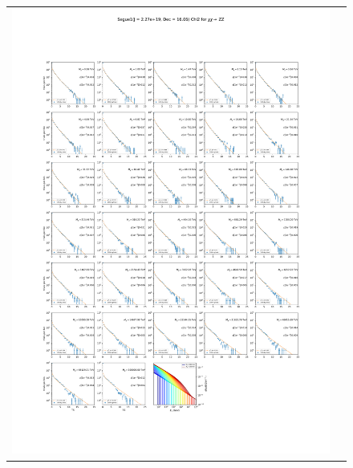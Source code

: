 \begin{figure}[ht]
{\begin{tabular}{cc}
            \includegraphics[clip, trim=22.1cm 6.5cm 19.5cm 56.5cm, scale=0.6]{figures/ic_DM/dm_plots/Segue1_ZZ_chi2_Masspanel_2024-04-28.pdf} &

\end{tabular}}
\end{figure}
